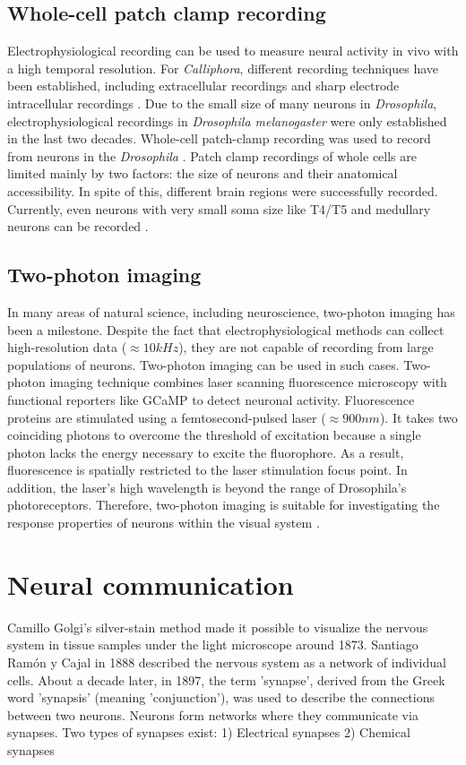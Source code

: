 \subsection{Whole-cell patch clamp recording}
Electrophysiological recording can be used to measure neural activity in vivo with a high temporal resolution. For \textit{Calliphora}, different recording techniques have been established, including extracellular recordings and sharp electrode intracellular recordings \parencite{Haag2001}. Due to the small size of many neurons in \textit{Drosophila}, electrophysiological recordings in \textit{Drosophila melanogaster} were only established in the last two decades. Whole-cell patch-clamp recording was used to record from neurons in the \textit{Drosophila} \parencite{ Joesch2008}. Patch clamp recordings of whole cells are limited mainly by two factors: the size of neurons and their anatomical accessibility. In spite of this, different brain regions were successfully recorded. Currently, even neurons with very small soma size like T4/T5 and medullary neurons can be recorded \parencite{Gruntman2018, Groschner2022}.

\subsection{Two-photon imaging}
In many areas of natural science, including neuroscience, two-photon imaging \parencite{Denk1990} has been a milestone. Despite the fact that electrophysiological methods can collect high-resolution data ($\approx 10kHz$), they are not capable of recording from large populations of neurons. Two-photon imaging can be used in such cases. Two-photon imaging technique combines laser scanning fluorescence microscopy with functional reporters like GCaMP to detect neuronal activity. Fluorescence proteins are stimulated using a femtosecond-pulsed laser ($\approx 900nm$). It takes two coinciding photons to overcome the threshold of excitation because a single photon lacks the energy necessary to excite the fluorophore. As a result, fluorescence is spatially restricted to the laser stimulation focus point. In addition, the laser's high wavelength is beyond the range of Drosophila's photoreceptors. Therefore, two-photon imaging is suitable for investigating the response properties of neurons within the visual system \parencite{Maisak2013}.

\section{Neural communication}
Camillo Golgi's silver-stain method made it possible to visualize the nervous system in tissue samples under the light microscope around 1873. Santiago Ramón y Cajal in 1888 described the nervous system as a network of individual cells. About a decade later, in 1897, the term 'synapse', derived from the Greek word 'synapsis' (meaning 'conjunction'), was used to describe the connections between two neurons. Neurons form networks where they communicate via synapses. Two types of synapses exist: 1) Electrical synapses 2) Chemical synapses

